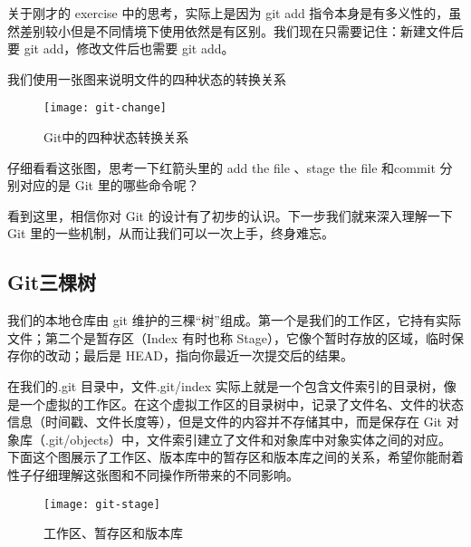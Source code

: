 \begin{note}
关于刚才的 exercise 中的思考，实际上是因为 git add 指令本身是有多义性的，虽然差别较小但是不同情境下使用依然是有区别。我们现在只需要记住：新建文件后要 git add，修改文件后也需要 git add。
\end{note}

我们使用一张图来说明文件的四种状态的转换关系

\begin{figure}[htbp]
	\centering
	\texttt{[image: git-change]}
	\caption{Git中的四种状态转换关系}\label{fig:git-change}
\end{figure}

\begin{thinking}\label{think-箭头与指令}
仔细看看这张图，思考一下红箭头里的 add the file 、stage the file 和commit 分别对应的是 Git 里的哪些命令呢？
\end{thinking}

看到这里，相信你对 Git 的设计有了初步的认识。下一步我们就来深入理解一下 Git 里的一些机制，从而让我们可以一次上手，终身难忘。

\subsection{Git三棵树}
我们的本地仓库由 git 维护的三棵“树”组成。第一个是我们的工作区，它持有实际文件；第二个是暂存区（Index 有时也称 Stage），它像个暂时存放的区域，临时保存你的改动；最后是 HEAD，指向你最近一次提交后的结果。 

在我们的.git 目录中，文件.git/index 实际上就是一个包含文件索引的目录树，像是一个虚拟的工作区。在这个虚拟工作区的目录树中，记录了文件名、文件的状态信息（时间戳、文件长度等），但是文件的内容并不存储其中，而是保存在 Git 对象库（.git/objects）中，文件索引建立了文件和对象库中对象实体之间的对应。下面这个图展示了工作区、版本库中的暂存区和版本库之间的关系，希望你能耐着性子仔细理解这张图和不同操作所带来的不同影响。

\begin{figure}[htbp]
  \centering
  \texttt{[image: git-stage]}
  \caption{工作区、暂存区和版本库}\label{fig:git-stage} 
\end{figure}

